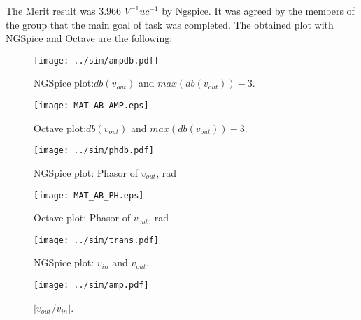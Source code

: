 The Merit result was 3.966 $V^{-1}uc^{-1}$ by Ngspice. It was agreed by the members of the group that the main goal of task was completed.
\newpage
The obtained plot with NGSpice and Octave are the following:

\begin{figure}[h] \centering
	\vspace{-3cm}
	\texttt{[image: ../sim/ampdb.pdf]}
	\caption{NGSpice plot:$db(v_{out})$ and $max(db(v_{out}))-3$.}
\end{figure}

\begin{figure}[h] \centering
	\texttt{[image: MAT\_AB\_AMP.eps]}
	\caption{Octave plot:$db(v_{out})$ and $max(db(v_{out}))-3$.}
	\label{fig:SIM_OUT}
\end{figure}

\newpage

\begin{figure}[h] \centering
	\vspace{-3cm}
	\texttt{[image: ../sim/phdb.pdf]}
	\caption{NGSpice plot: Phasor of $v_{out}$, rad}
\end{figure}

\begin{figure}[h] \centering
	\texttt{[image: MAT\_AB\_PH.eps]}
	\caption{Octave plot: Phasor of $v_{out}$, rad}
\end{figure}

\newpage

\begin{figure}[h] \centering
	\vspace{-3cm}
	\texttt{[image: ../sim/trans.pdf]}
	\caption{NGSpice plot: $v_{in}$ and $v_{out}$.}
\end{figure}

\begin{figure}[h] \centering
	\vspace{-3cm}
	\texttt{[image: ../sim/amp.pdf]}
	\caption{$ \left | v_{out}/v_{in} \right |$.}
	\vspace{-2cm}
\end{figure}
